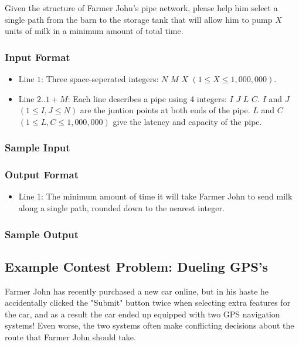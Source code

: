 Given the structure of Farmer John's pipe network, please help him select a single path from the barn to the storage tank that will allow him to pump $X$ units
of milk in a minimum amount of total time.

\subsubsection{Input Format}
\begin{itemize}
	\item Line $1$: Three space-seperated integers: $N$ $M$ $X$ $(1 \leq X \leq 1,000,000)$.
	\item Line $2..1+M$: Each line describes a pipe using 4 integers: $I$ $J$ $L$ $C$.
			$I$ and $J$ $(1 \leq I,J \leq N)$ are the juntion points at both ends of the pipe.
			$L$ and $C$ $(1 \leq L,C \leq 1,000,000)$ give the latency and capacity of the pipe.
\end{itemize}

\subsubsection{Sample Input}

\subsubsection{Output Format}
\begin{itemize}
	\item Line 1: The minimum amount of time it will take Farmer John to send milk along a single path, 
			rounded down to the nearest integer.
\end{itemize}

\subsubsection{Sample Output}

\subsection{Example Contest Problem: Dueling GPS's\cite{gpsduel}}
Farmer John has recently purchased a new car online, but in his haste he accidentally clicked the "Submit" button twice when selecting extra
features for the car, and as a result the car ended up equipped with two GPS navigation systems!  
Even worse, the two systems often make conflicting decisions about the route that Farmer John should take.

